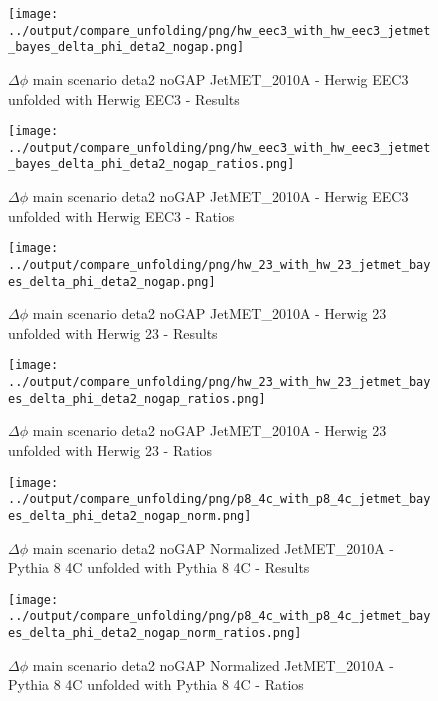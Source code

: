\documentclass[11pt]{book}
\begin{document}
\begin{figure}[ht]
\centering
\texttt{[image: ../output/compare\_unfolding/png/hw\_eec3\_with\_hw\_eec3\_jetmet\_bayes\_delta\_phi\_deta2\_nogap.png]}
\caption{$\Delta\phi$ main scenario deta2 noGAP JetMET\_2010A - Herwig EEC3 unfolded with Herwig EEC3 - Results}
\label{hw_eec3_hw_eec3_jetmet_bayes_delta_phi_deta2_nogap_a}
\end{figure}

\begin{figure}[ht]
\centering
\texttt{[image: ../output/compare\_unfolding/png/hw\_eec3\_with\_hw\_eec3\_jetmet\_bayes\_delta\_phi\_deta2\_nogap\_ratios.png]}
\caption{$\Delta\phi$ main scenario deta2 noGAP JetMET\_2010A - Herwig EEC3 unfolded with Herwig EEC3 - Ratios}
\label{hw_eec3_hw_eec3_jetmet_bayes_delta_phi_deta2_nogap_b}
\end{figure}

\begin{figure}[ht]
\centering
\texttt{[image: ../output/compare\_unfolding/png/hw\_23\_with\_hw\_23\_jetmet\_bayes\_delta\_phi\_deta2\_nogap.png]}
\caption{$\Delta\phi$ main scenario deta2 noGAP JetMET\_2010A - Herwig 23 unfolded with Herwig 23 - Results}
\label{hw_23_hw_23_jetmet_bayes_delta_phi_deta2_nogap_a}
\end{figure}

\begin{figure}[ht]
\centering
\texttt{[image: ../output/compare\_unfolding/png/hw\_23\_with\_hw\_23\_jetmet\_bayes\_delta\_phi\_deta2\_nogap\_ratios.png]}
\caption{$\Delta\phi$ main scenario deta2 noGAP JetMET\_2010A - Herwig 23 unfolded with Herwig 23 - Ratios}
\label{hw_23_hw_23_jetmet_bayes_delta_phi_deta2_nogap_b}
\end{figure}


\begin{figure}[ht]
\centering
\texttt{[image: ../output/compare\_unfolding/png/p8\_4c\_with\_p8\_4c\_jetmet\_bayes\_delta\_phi\_deta2\_nogap\_norm.png]}
\caption{$\Delta\phi$ main scenario deta2 noGAP Normalized JetMET\_2010A - Pythia 8 4C unfolded with Pythia 8 4C - Results}
\label{p8_p8_jetmet_bayes_delta_phi_deta2_nogap_norm_a}
\end{figure}

\begin{figure}[ht]
\centering
\texttt{[image: ../output/compare\_unfolding/png/p8\_4c\_with\_p8\_4c\_jetmet\_bayes\_delta\_phi\_deta2\_nogap\_norm\_ratios.png]}
\caption{$\Delta\phi$ main scenario deta2 noGAP Normalized JetMET\_2010A - Pythia 8 4C unfolded with Pythia 8 4C - Ratios}
\label{p8_p8_jetmet_bayes_delta_phi_deta2_nogap_norm_b}
\end{figure}
\end{document}
